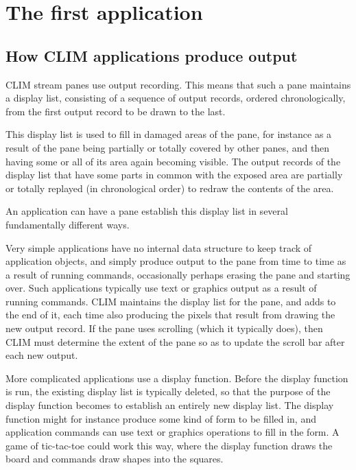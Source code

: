 \chapter{The first application}

\section{How CLIM applications produce output}

CLIM stream panes use output recording.  This means that such a pane
maintains a display list, consisting of a sequence of output records,
ordered chronologically, from the first output record to be drawn to
the last.  

This display list is used to fill in damaged areas of the pane, for
instance as a result of the pane being partially or totally covered by
other panes, and then having some or all of its area again becoming
visible.  The output records of the display list that have some parts
in common with the exposed area are partially or totally replayed (in
chronological order) to redraw the contents of the area.

An application can have a pane establish this display list in several
fundamentally different ways.

Very simple applications have no internal data structure to keep track
of application objects, and simply produce output to the pane from
time to time as a result of running commands, occasionally perhaps
erasing the pane and starting over.  Such applications typically use
text or graphics output as a result of running commands.  CLIM
maintains the display list for the pane, and adds to the end of it,
each time also producing the pixels that result from drawing the new
output record.  If the pane uses scrolling (which it typically does),
then CLIM must determine the extent of the pane so as to update the
scroll bar after each new output.  

More complicated applications use a display function.  Before the
display function is run, the existing display list is typically
deleted, so that the purpose of the display function becomes to
establish an entirely new display list.  The display function might
for instance produce some kind of form to be filled in, and
application commands can use text or graphics operations to fill in
the form.  A game of tic-tac-toe could work this way, where the
display function draws the board and commands draw shapes into the
squares.  

